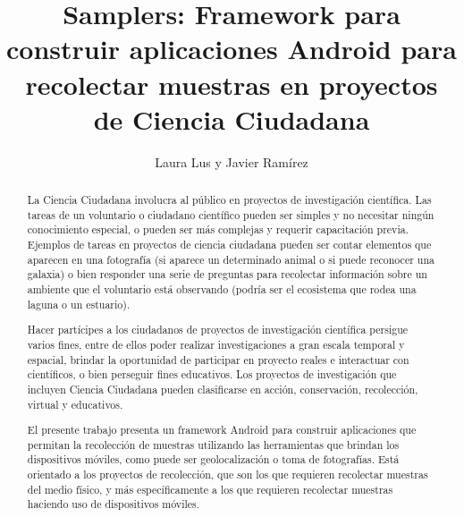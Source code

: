 \documentclass[11pt]{report}
\begin{document}



\title{Samplers: Framework para construir aplicaciones Android para recolectar muestras en proyectos de Ciencia Ciudadana}
\author{Laura Lus y Javier Ramírez}

\maketitle

\begin{abstract}


La Ciencia Ciudadana involucra al público en proyectos de investigación científica. Las tareas de un voluntario o ciudadano científico pueden ser simples y no necesitar ningún conocimiento especial, o pueden ser más complejas y requerir capacitación previa. Ejemplos de tareas en proyectos de ciencia ciudadana pueden ser contar elementos que aparecen en una fotografía (si aparece un determinado animal o si puede reconocer una galaxia) o bien responder una serie de preguntas para recolectar información sobre un ambiente que el voluntario está observando (podría ser el ecosistema que rodea una laguna o un estuario). 

Hacer partícipes a los ciudadanos de proyectos de investigación científica persigue varios fines, entre de ellos poder realizar investigaciones a gran escala temporal y espacial, brindar la oportunidad de participar en proyecto reales e interactuar con científicos, o bien perseguir fines educativos. Los proyectos de investigación que incluyen Ciencia Ciudadana pueden clasificarse en acción, conservación, recolección, virtual y educativos. 

El presente trabajo presenta un framework Android para construir aplicaciones que permitan la recolección de muestras utilizando las herramientas que brindan los dispositivos móviles, como puede ser geolocalización o toma de fotografías. Está orientado a los proyectos de recolección, que son los que requieren recolectar muestras del medio físico, y más específicamente a los que requieren recolectar muestras haciendo uso de dispositivos móviles.  

\end{abstract}
\end{document}
